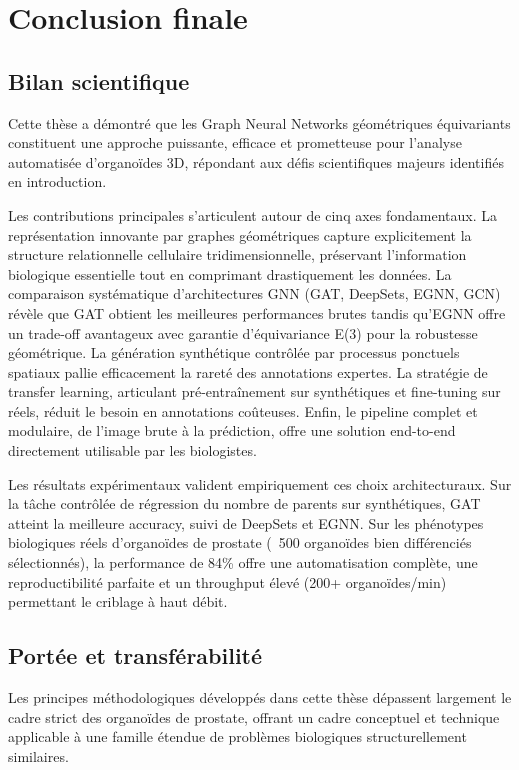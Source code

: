 \section{Conclusion finale}

\subsection{Bilan scientifique}

Cette thèse a démontré que les Graph Neural Networks géométriques équivariants constituent une approche puissante, efficace et prometteuse pour l'analyse automatisée d'organoïdes 3D, répondant aux défis scientifiques majeurs identifiés en introduction.

Les contributions principales s'articulent autour de cinq axes fondamentaux. La représentation innovante par graphes géométriques capture explicitement la structure relationnelle cellulaire tridimensionnelle, préservant l'information biologique essentielle tout en comprimant drastiquement les données. La comparaison systématique d'architectures GNN (GAT, DeepSets, EGNN, GCN) révèle que GAT obtient les meilleures performances brutes tandis qu'EGNN offre un trade-off avantageux avec garantie d'équivariance E(3) pour la robustesse géométrique. La génération synthétique contrôlée par processus ponctuels spatiaux pallie efficacement la rareté des annotations expertes. La stratégie de transfer learning, articulant pré-entraînement sur synthétiques et fine-tuning sur réels, réduit le besoin en annotations coûteuses. Enfin, le pipeline complet et modulaire, de l'image brute à la prédiction, offre une solution end-to-end directement utilisable par les biologistes.

Les résultats expérimentaux valident empiriquement ces choix architecturaux. Sur la tâche contrôlée de régression du nombre de parents sur synthétiques, GAT atteint la meilleure accuracy, suivi de DeepSets et EGNN. Sur les phénotypes biologiques réels d'organoïdes de prostate (~500 organoïdes bien différenciés sélectionnés), la performance de 84\% offre une automatisation complète, une reproductibilité parfaite et un throughput élevé (200+ organoïdes/min) permettant le criblage à haut débit.

\subsection{Portée et transférabilité}

Les principes méthodologiques développés dans cette thèse dépassent largement le cadre strict des organoïdes de prostate, offrant un cadre conceptuel et technique applicable à une famille étendue de problèmes biologiques structurellement similaires.


